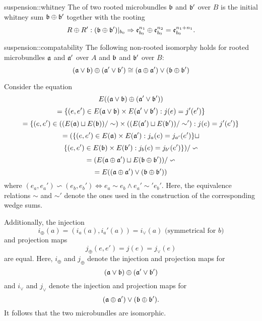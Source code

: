 \begin{mydefinition}{suspension::whitney}
    The  of two rooted microbundles $\bb$ and $\bb'$ over $B$
    is the initial whitney sum $\whitney{\bb}{\bb'}$ together with the rooting
    \[ \germdef{\whitney{R}{R'}}{(\whitney{\bb}{\bb'})\restr{b_0}}{\whitney{\be[n_1]{b_0}}{\be[n_2]{b_0}} = \be[n_1 + n_1]{b_0}}. \]
\end{mydefinition}

\begin{mylemma}{suspension::compatability}   
    The following non-rooted isomorphy holds
    for rooted microbundles $\ba$ and $\ba'$ over $A$
    and $\bb$ and $\bb'$ over $B$: 
    \[
        \whitney{(\ba \vee \bb)}{(\ba' \vee \bb')}
        \cong (\whitney{\ba}{\ba'}) \vee (\whitney{\bb}{\bb'})
    \]
\end{mylemma}
\begin{myproof}
    Consider the equation
    \[ E(\whitney{(\ba \vee \bb)}{(\ba' \vee \bb')}) \]
    \[ = \set{(e, e') \in E(\ba \vee \bb) \times E(\ba' \vee \bb')}{j(e) = j'(e')} \]
    \[ = \set{(e, e') \in ((E(\ba) \sqcup E(\bb)) / \sim) \times ((E(\ba') \sqcup E(\bb')) / \sim')}{j(e) = j'(e')} \]
    \[ = (\set{(e, e') \in E(\ba) \times E(\ba')}{j_a(e) = j_{a'}(e')} \sqcup \]
    \[ \set{(e, e') \in E(\bb) \times E(\bb')}{j_b(e) = j_{b'}(e')}) / \backsim \]
    \[ = (E(\whitney{\ba}{\ba'}) \sqcup E(\whitney{\bb}{\bb'})) / \backsim \]
    \[ = E((\whitney{\ba}{\ba'}) \vee (\whitney{\bb}{\bb'})) \]
    where $(e_a, e_a') \backsim (e_b, e_b') \iff e_a \sim e_b \land e_a' \sim' e_b'$.
    Here, the equivalence relations $\sim$ and $\sim'$ denote the ones
    used in the construction of the corresponding wedge sums.

    Additionally, the injection
    \[ i_\oplus(a) = (i_a(a), i_a'(a)) = i_\vee(a) \text{ (symmetrical for $b$)}\]
    and projection maps
    \[ j_\oplus(e, e') = j(e) =  j_\vee(e) \]
    are equal.
    Here, $i_\oplus$ and $j_\oplus$ denote the injection and projection maps for
    \[ \whitney{(\ba \vee \bb)}{(\ba' \vee \bb')} \]
    and $i_\vee$ and $j_\vee$ denote the injection and projection maps for
    \[ (\whitney{\ba}{\ba'}) \vee (\whitney{\bb}{\bb'}). \]
    It follows that the two microbundles are isomorphic.
\end{myproof}